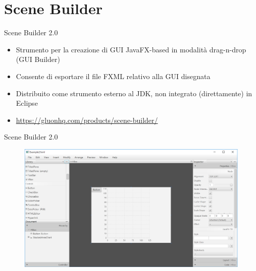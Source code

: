 \documentclass[xcolor=dvipsnames,presentation]{beamer}
\begin{document}
\section{Scene Builder}

\begin{frame}{Scene Builder 2.0}
\begin{itemize}\itemsep10pt
\item Strumento per la creazione di GUI JavaFX-based in modalità drag-n-drop (GUI Builder)
\item Consente di esportare il file FXML relativo alla GUI disegnata
\item Distribuito come strumento esterno al JDK, non integrato (direttamente) in Eclipse
\item \url{https://gluonhq.com/products/scene-builder/}
\end{itemize}
\end{frame}

\begin{frame}{Scene Builder 2.0}
\begin{figure}
\includegraphics[width=\textwidth]{img/scenebuilder.png}
\end{figure}
\end{frame}

%
\end{document}
